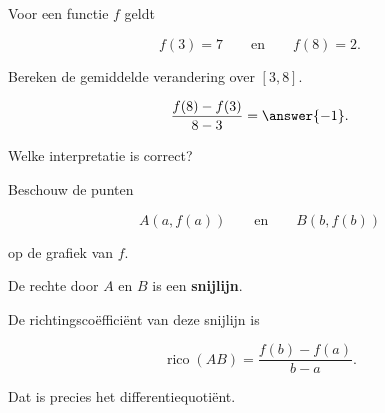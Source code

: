 \documentclass{ximera}
\begin{document}
\begin{oefening}{\oefB \ESS}

Voor een functie $f$ geldt

\[
f(3)=7
\qquad\text{en}\qquad
f(8)=2.
\]

Bereken de gemiddelde verandering over $[3,8]$.

\[
\frac{f(8)-f(3)}{8-3}
=
\answer{-1}.
\]

Welke interpretatie is correct?

\begin{multipleChoice}
\end{multipleChoice}

\end{oefening}




Beschouw de punten

\[
A(a,f(a))
\qquad\text{en}\qquad
B(b,f(b))
\]

op de grafiek van $f$.

De rechte door $A$ en $B$ is een \textbf{snijlijn}.

De richtingscoëfficiënt van deze snijlijn is

\[
\operatorname{rico}(AB)
=
\frac{f(b)-f(a)}{b-a}.
\]

Dat is precies het differentiequotiënt.
\end{document}
